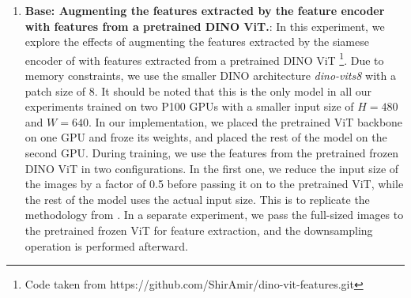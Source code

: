 \begin{enumerate}
    \item \textbf{{\mvsn} Base: Augmenting the features extracted by the {\mvsn} feature encoder with features from a pretrained DINO ViT.}: In this experiment, we explore the effects of augmenting the features extracted by the siamese encoder of {\mvsn} with features extracted from a pretrained DINO ViT \cite{amir2021deep}\footnote{Code taken from https://github.com/ShirAmir/dino-vit-features.git}. Due to memory constraints, we use the smaller DINO architecture \textit{dino-vits8} \cite{caron2021emerging} with a patch size of 8. It should be noted that this is the only model in all our experiments trained on two P100 GPUs with a smaller input size of $H=480$ and $W=640$. In our implementation, we placed the pretrained ViT backbone on one GPU and froze its weights, and placed the rest of the model on the second GPU. During training, we use the features from the pretrained frozen DINO ViT in two configurations. In the first one, we reduce the input size of the images by a factor of 0.5 before passing it on to the pretrained ViT, while the rest of the model uses the actual input size. This is to replicate the methodology from \cite{cao2022mvsformer}. In a separate experiment, we pass the full-sized images to the pretrained frozen ViT for feature extraction, and the downsampling operation is performed afterward. \par
    

\end{enumerate}
